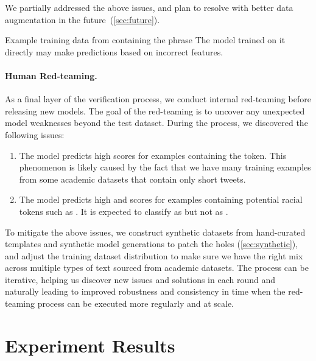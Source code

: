 \documentclass[letterpaper]{article} %
\begin{document}
We partially addressed the above issues, and plan to resolve with better data augmentation in the future~(\cref{sec:future}). %

\begin{table}[!t]
 \centering
 \resizebox{\columnwidth}{!}{}
 \caption{Example training data from \citep{hatecheck} containing the phrase  The model trained on it directly may make predictions based on incorrect features.}
 \label{tb:hatecheck}
\end{table}


\paragraph{Human Red-teaming.} As a final layer of the verification process, we conduct internal red-teaming before releasing new models. The goal of the red-teaming is to uncover any unexpected model weaknesses beyond the test dataset. During the process, we discovered the following issues:

\begin{enumerate}
    \item The model predicts high  scores for examples containing the \qt{\#} token. This phenomenon is likely caused by the fact that we have many  training examples from some academic datasets that contain only short tweets.
    \item The model predicts high  and  scores for examples containing potential racial tokens such as . It is expected to classify  as  but not  as .
\end{enumerate}

To mitigate the above issues, we construct synthetic datasets from hand-curated templates and synthetic model generations to patch the holes (\cref{sec:synthetic}), and adjust the training dataset distribution to make sure we have the right mix across multiple types of text sourced from academic datasets. The process can be iterative, helping us discover new issues and solutions in each round and naturally leading to improved robustness and consistency in time when the red-teaming process can be executed more regularly and at scale.


\section{Experiment Results}
\end{document}
